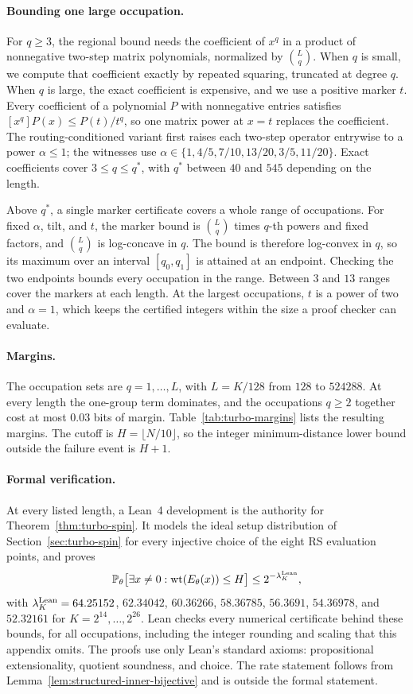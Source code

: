 \paragraph{Bounding one large occupation.}
For $q\ge3$, the regional bound needs the coefficient of $x^q$ in a
product of nonnegative two-step matrix polynomials, normalized by
$\binom Lq$. When $q$ is small, we compute that coefficient exactly by
repeated squaring, truncated at degree $q$. When $q$ is large, the exact
coefficient is expensive, and we use a positive marker $t$. Every
coefficient of a polynomial $P$ with nonnegative entries satisfies
$[x^q]P(x)\le P(t)/t^q$, so one matrix power at $x=t$ replaces the
coefficient. The routing-conditioned variant first raises each two-step
operator entrywise to a power $\alpha\le1$; the witnesses use
$\alpha\in\{1,4/5,7/10,13/20,3/5,11/20\}$. Exact coefficients cover
$3\le q\le q^*$, with $q^*$ between $40$ and $545$ depending on the length.

Above $q^*$, a single marker certificate covers a whole range of
occupations. For fixed $\alpha$, tilt, and $t$, the marker bound is
$\binom Lq$ times $q$-th powers and fixed factors, and $\binom Lq$ is
log-concave in $q$. The bound is therefore log-convex in $q$, so its
maximum over an interval $[q_0,q_1]$ is attained at an endpoint. Checking
the two endpoints bounds every occupation in the range. Between $3$ and
$13$ ranges cover the markers at each length. At the largest occupations,
$t$ is a power of two and $\alpha=1$, which keeps the certified integers
within the size a proof checker can evaluate.

\paragraph{Margins.}
The occupation sets are $q=1,\ldots,L$, with $L=K/128$ from $128$ to
$524288$. At every length the one-group term dominates, and the
occupations $q\ge2$ together cost at most $0.03$ bits of margin.
Table~\ref{tab:turbo-margins} lists the resulting margins. The cutoff is
$H=\lfloor N/10\rfloor$, so the integer minimum-distance lower bound
outside the failure event is $H+1$.

\paragraph{Formal verification.}
At every listed length, a Lean~4 development is the authority for
Theorem~\ref{thm:turbo-spin}\repositorycite. It models the ideal setup
distribution of Section~\ref{sec:turbo-spin} for every injective choice of
the eight RS evaluation points, and proves
\[
 \mathbb P_\theta\bigl[\exists x\ne0:\operatorname{wt}(E_\theta(x))\le H\bigr]
 \le 2^{-\lambda^{\rm Lean}_K},
\]
with $\lambda^{\rm Lean}_K=64.25152$, $62.34042$, $60.36266$, $58.36785$,
$56.3691$, $54.36978$, and $52.32161$ for $K=2^{14},\ldots,2^{26}$.
Lean checks every numerical certificate behind these bounds, for all
occupations, including the integer rounding and scaling that this
appendix omits. The proofs use only Lean's standard axioms: propositional
extensionality, quotient soundness, and choice. The rate statement follows
from Lemma~\ref{lem:structured-inner-bijective} and is outside the formal
statement.

